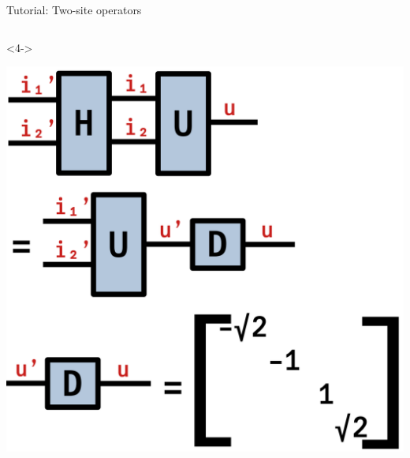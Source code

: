 \begin{frame}[fragile]{Tutorial: Two-site operators}
\begin{columns}
\begin{column}{5cm}
\begin{onlyenv}<4->
\vspace*{0.0cm}
\begin{center}
\includegraphics[width=1.0\textwidth]{
  slides/assets/eigen_H.png
}
\end{center}
\vspace*{0.0cm}
\end{onlyenv}

\end{column}

\end{columns}

\end{frame}

